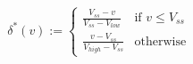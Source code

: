 \begin{equation}
 \delta^{*}(v) := 
 \begin{cases} 
 \frac{V_{ss} - v}{V_{ss} - V_{low}} & \text{if } v \leq V_{ss} \\
 \frac{v - V_{ss}}{V_{high} - V_{ss}} & \text{otherwise}
 \end{cases}
 \label{ch1:equ:voltage-scaling-factor}
\end{equation}
